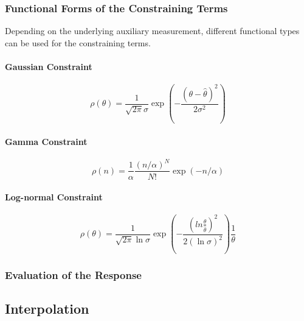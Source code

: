 \subsubsection*{Functional Forms of the Constraining Terms}

Depending on the underlying auxiliary measurement, different functional types can be used for the constraining terms.

\paragraph{Gaussian Constraint}

\begin{equation}
\label{eq:stat:gauss}
\rho( \theta) = \frac{1}{\sqrt{2\pi}\sigma}\exp\left( -\frac{(\theta - \hat{\theta})^2}{2\sigma^2} \right)
\end{equation}

\paragraph{Gamma Constraint}

\begin{equation}
\label{eq:stat:poisson}
\rho(n) = \frac{1}{\alpha} \frac{(n/\alpha)^N}{N!} \exp\left( -n/\alpha \right)
\end{equation}

\paragraph{Log-normal Constraint}

\begin{equation}
\label{eq:stat:lognorm}
\rho( \theta) = \frac{1}{\sqrt{2\pi}\ln{\sigma}}\exp\left( -\frac{(ln{\frac{\theta}{\hat{\theta}}})^2}{2(\ln{\sigma})^2} \right)\frac{1}{\theta}
\end{equation}


\subsubsection*{Evaluation of the Response}

\subsection*{Interpolation}

\iffalse
\begin{equation}
\label{eq:stat:lik_boh}
L(\mu, \vec{\theta}) =
\prod_{j=1}^N \frac{ (\mu s_{j} +
b_{j} )^{n_{j}} }{ n_{j}! }
e^{- (\mu s_{j} + b_{j}) }   \;\;
\prod_{k=1}^M \frac{ u_k^{m_{k}}} { m_{k}! } \,
e^{- u_k }  \;.
\end{equation}
\fi



